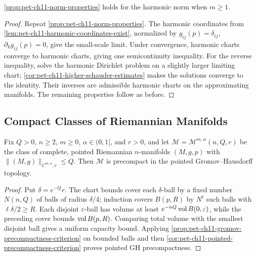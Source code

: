 \begin{proposition}
  \label{prop:pet-ch11-harmonic-norm-properties}
  \cref{prop:pet-ch11-norm-properties} holds for the harmonic norm when
  $m\ge1$.
\end{proposition}
\begin{proof}
  \sketch
  Repeat \cref{prop:pet-ch11-norm-properties}. The harmonic coordinates from
  \cref{lem:pet-ch11-harmonic-coordinates-exist}, normalized by
  \(g_{ij}(p)=\delta_{ij}\), \(\partial_kg_{ij}(p)=0\), give the small-scale
  limit. Under convergence, harmonic charts converge to harmonic charts,
  giving one semicontinuity inequality. For the reverse inequality, solve the
  harmonic Dirichlet problem on a slightly larger limiting chart;
  \cref{cor:pet-ch11-higher-schauder-estimates} makes the solutions converge
  to the identity. Their inverses are admissible harmonic charts on the
  approximating manifolds. The remaining properties follow as before.
\end{proof}


\subsection{Compact Classes of Riemannian Manifolds}

\begin{lemma}
  \label{lem:pet-ch11-fundamental-thm-precompact-gh}
  Fix $Q>0$, $n\ge2$, $m\ge0$, $\alpha\in(0,1]$, and $r>0$, and let
  $\mathcal{M}=\mathcal{M}^{m,\alpha}(n,Q,r)$ be the class of complete,
  pointed Riemannian $n$-manifolds $(M,g,p)$ with
  $\|(M,g)\|_{C^{m,\alpha},r}\le Q$. Then $\mathcal{M}$ is precompact in the
  pointed Gromov--Hausdorff topology.
\end{lemma}
\begin{proof}
  \sketch
  Put \(\delta=e^{-Q}r\). The chart bounds cover each \(\delta\)-ball by a
  fixed number \(N(n,Q)\) of balls of radius \(\delta/4\); induction covers
  \(B(p,R)\) by \(N^\ell\) such balls with \(\ell\delta/2\ge R\). Each
  disjoint \(\varepsilon\)-ball has volume at least
  \(e^{-nQ}\operatorname{vol} B(0,\varepsilon)\), while the preceding cover bounds
  \(\operatorname{vol} B(p,R)\). Comparing total volume with the smallest disjoint ball
  gives a uniform capacity bound. Applying
  \cref{prop:pet-ch11-gromov-precompactness-criterion} on bounded balls and
  then \cref{cor:pet-ch11-pointed-precompactness-criterion} proves pointed GH
  precompactness.
\end{proof}


